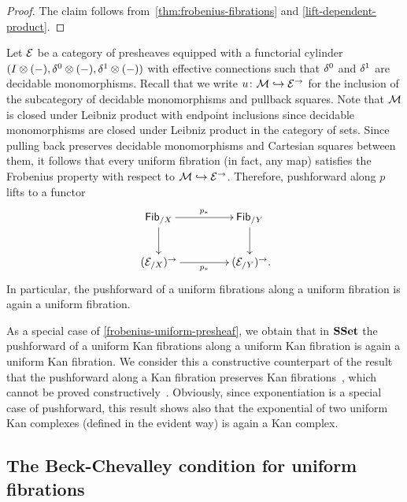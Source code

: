 \documentclass[reqno,10pt,a4paper,oneside,draft]{amsart}
\begin{document}
\begin{proof} The claim follows from~\cref{thm:frobenius-fibrations} and \cref{lift-dependent-product}.
\end{proof}

\begin{example} \label{frobenius-uniform-presheaf}
Let $\catE$ be a category of presheaves equipped with a functorial cylinder $(\interval \otimes (-), \lcyl \otimes (-), \rcyl \otimes (-))$ with effective connections such that $\lcyl$ and $\rcyl$ are decidable monomorphisms.
Recall that we write $u \co \cal{M} \hookrightarrow \catE^\to$ for the inclusion of the subcategory of decidable monomorphisms and pullback squares.
Note that $\cal{M}$ is closed under Leibniz product with endpoint inclusions since decidable monomorphisms are closed under Leibniz product in the category of sets.
Since pulling back preserves decidable monomorphisms and Cartesian squares between them, it follows that every uniform fibration (in fact, any map) satisfies the Frobenius property with respect to $\cal{M} \hookrightarrow \catE^\to$.
Therefore, pushforward along $p$ lifts to a functor
\[
\xymatrix@C+2em{
  \Fib_{/X} \ar[r]^{p_*} \ar[d]_{} & \Fib_{/Y} \ar[d] \\
  (\catE_{/X})^\to \ar[r]_{p_*} & (\catE_{/Y})^\to \rlap{.}
}
\]
In particular, the pushforward of a uniform fibrations along a uniform fibration is again a uniform fibration.
\end{example}

\begin{example}
As a special case of \cref{frobenius-uniform-presheaf}, we obtain that in $\SSet$ the pushforward of a uniform Kan fibrations along a uniform Kan fibration is again a uniform Kan fibration.
We consider this a constructive counterpart of the result that the pushforward along a Kan fibration preserves Kan fibrations~\cite{voevodsky-simplicial-model}, which cannot be proved constructively~\cite{coquand-non-constructivity-kan}.
Obviously, since exponentiation is a special case of pushforward, this result shows also that the exponential of two uniform Kan complexes (defined in the evident way) is again a Kan complex.
\end{example}


\subsection*{The Beck-Chevalley condition for uniform fibrations}
\end{document}
